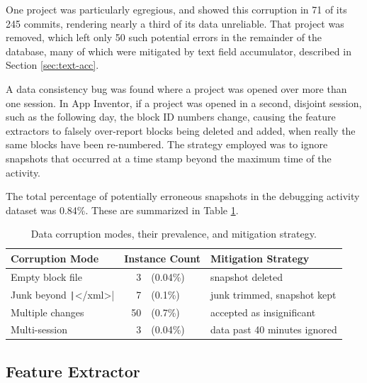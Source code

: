 One project was particularly egregious, and showed this corruption in 71 of its 245 commits, rendering nearly a third of its data unreliable. That project was removed, which left only 50 such potential errors in the remainder of the database, many of which were mitigated by text field accumulator, described in Section \ref{sec:text-acc}. 

A data consistency bug was found where a project was opened over more than one session. In App Inventor, if a project was opened in a second, disjoint session, such as the following day, the block ID numbers change, causing the feature extractors to falsely over-report blocks being deleted and added, when really the same blocks have been re-numbered. The strategy employed was to ignore snapshots that occurred at a time stamp beyond the maximum time of the activity.

The total percentage of potentially erroneous snapshots in the debugging activity dataset was 0.84\%. These are summarized in Table \ref{tab:data-corruption}.

	
\begin{table}
\begin{centering}
	\begin{tabular}{l r l p{5.4cm}}
	Corruption Mode 		& \multicolumn{2}{l}{Instance Count} 		& Mitigation Strategy 			\\ \hline
	Empty block file 						&  3 &(0.04\%) 				& snapshot deleted 						\\
	Junk beyond \texttt|</xml>| 	&  7 &(0.1\%) 				& junk trimmed, snapshot kept 			\\
	Multiple changes 						& 50 &(0.7\%) 				& accepted as insignificant 			\\
	Multi-session 							&  3 &(0.04\%) 				& data past 40 minutes ignored
	\end{tabular}
	\caption[Data corruption modes]{Data corruption modes, their prevalence, and mitigation strategy.}
	\label{tab:data-corruption}
\end{centering}
\end{table}


\subsection{Feature Extractor}
\label{sec:feature-extraction}

